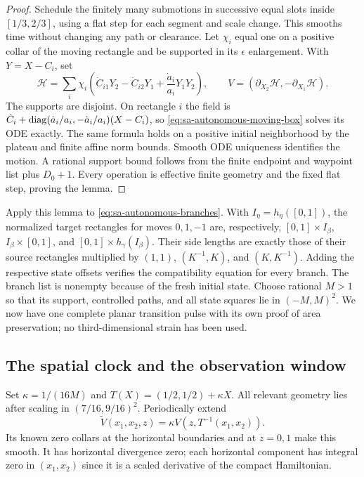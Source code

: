 \begin{proof}
Schedule the finitely many submotions in successive equal slots inside
$[1/3,2/3]$, using a flat step for each segment and scale change.  This
smooths time without changing any path or clearance.  Let $\chi_i$
equal one on a positive collar of the moving rectangle and be supported
in its $\epsilon$ enlargement.  With $Y=X-C_i$, set
\begin{equation}\label{eq:sa-autonomous-hamiltonian}
 \mathcal H=\sum_i\chi_i\left(
       \dot C_{i1}Y_2-\dot C_{i2}Y_1
                  +\frac{\dot a_i}{a_i}Y_1Y_2\right),\qquad
 V=(\partial_{X_2}\mathcal H,-\partial_{X_1}\mathcal H).
\end{equation}
The supports are disjoint.  On rectangle $i$ the field is
$\dot C_i+\operatorname{diag}(\dot a_i/a_i,-\dot a_i/a_i)(X-C_i)$, so
\eqref{eq:sa-autonomous-moving-box} solves its ODE exactly.
The same formula holds on a positive initial neighborhood by the plateau
and finite affine norm bounds.  Smooth ODE uniqueness identifies the
motion.  A rational support bound follows from the finite endpoint and
waypoint list plus $D_0+1$.  Every operation is effective finite geometry
and the fixed flat step, proving the lemma.
\end{proof}

Apply this lemma to \eqref{eq:sa-autonomous-branches}. With
$I_\eta=h_\eta([0,1])$, the normalized target rectangles for moves
$0,1,-1$ are, respectively, $[0,1]\times I_\beta$,
$I_\beta\times[0,1]$, and $[0,1]\times h_\gamma(I_\beta)$.
Their side lengths are exactly those of their source rectangles multiplied
by $(1,1)$, $(K^{-1},K)$, and $(K,K^{-1})$. Adding the respective state
offsets verifies the compatibility equation for every branch.
The branch list is
nonempty because of the fresh initial state.  Choose rational $M>1$ so
that its support, controlled paths, and all state squares lie in $(-M,M)^2$.
We now have one complete planar transition pulse with its own proof of
area preservation; no third-dimensional strain has been used.

\subsection{The spatial clock and the observation window}
\label{subsec:sa-autonomous-clock}
Set $\kappa=1/(16M)$ and $T(X)=(1/2,1/2)+\kappa X$.
All relevant geometry lies after scaling in $(7/16,9/16)^2$.
Periodically extend
\[
 \widetilde V(x_1,x_2,z)=\kappa V(z,T^{-1}(x_1,x_2)).
\]
Its known zero collars at the horizontal boundaries and at $z=0,1$
make this smooth.  It has horizontal divergence zero; each horizontal
component has integral zero in $(x_1,x_2)$ since it is a scaled derivative
of the compact Hamiltonian.

